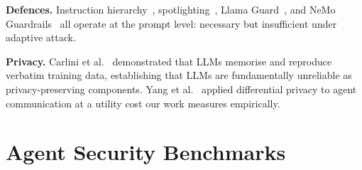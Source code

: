 \textbf{Defences.} Instruction hierarchy~\cite{wallace2024instruction}, spotlighting~\cite{hines2024spotlighting}, Llama Guard~\cite{inan2023llamaguard}, and NeMo Guardrails~\cite{rebedea2023nemo} all operate at the prompt level: necessary but insufficient under adaptive attack.

\textbf{Privacy.} Carlini et al.~\cite{carlini2021extracting} demonstrated that LLMs memorise and reproduce verbatim training data, establishing that LLMs are fundamentally unreliable as privacy-preserving components. Yang et al.~\cite{yang2026dpagent} applied differential privacy to agent communication at a utility cost our work measures empirically.


\section{Agent Security Benchmarks}
\label{sec:rw_benchmarks}

\begin{table}[ht]
\centering
\caption{Comparison of agent security benchmarks. $\checkmark$\ = fully supported, $\sim$ = partially, -- = not supported.}
\label{table:benchmark_comparison}
\end{table}

